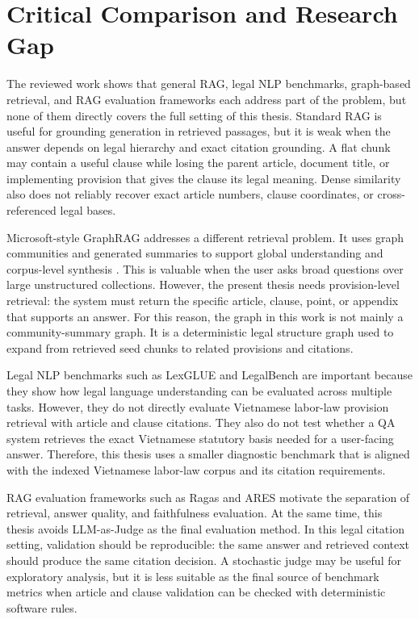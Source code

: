 \section{Critical Comparison and Research Gap}
The reviewed work shows that general RAG, legal NLP benchmarks, graph-based retrieval, and RAG evaluation frameworks each address part of the problem, but none of them directly covers the full setting of this thesis. Standard RAG is useful for grounding generation in retrieved passages, but it is weak when the answer depends on legal hierarchy and exact citation grounding. A flat chunk may contain a useful clause while losing the parent article, document title, or implementing provision that gives the clause its legal meaning. Dense similarity also does not reliably recover exact article numbers, clause coordinates, or cross-referenced legal bases.

Microsoft-style GraphRAG addresses a different retrieval problem. It uses graph communities and generated summaries to support global understanding and corpus-level synthesis \cite{edge2024graphrag}. This is valuable when the user asks broad questions over large unstructured collections. However, the present thesis needs provision-level retrieval: the system must return the specific article, clause, point, or appendix that supports an answer. For this reason, the graph in this work is not mainly a community-summary graph. It is a deterministic legal structure graph used to expand from retrieved seed chunks to related provisions and citations.

Legal NLP benchmarks such as LexGLUE \cite{chalkidis2021lexglue} and LegalBench \cite{guha2023legalbench} are important because they show how legal language understanding can be evaluated across multiple tasks. However, they do not directly evaluate Vietnamese labor-law provision retrieval with article and clause citations. They also do not test whether a QA system retrieves the exact Vietnamese statutory basis needed for a user-facing answer. Therefore, this thesis uses a smaller diagnostic benchmark that is aligned with the indexed Vietnamese labor-law corpus and its citation requirements.

RAG evaluation frameworks such as Ragas \cite{es2023ragas} and ARES \cite{saadfalcon2023ares} motivate the separation of retrieval, answer quality, and faithfulness evaluation. At the same time, this thesis avoids LLM-as-Judge as the final evaluation method. In this legal citation setting, validation should be reproducible: the same answer and retrieved context should produce the same citation decision. A stochastic judge may be useful for exploratory analysis, but it is less suitable as the final source of benchmark metrics when article and clause validation can be checked with deterministic software rules.

